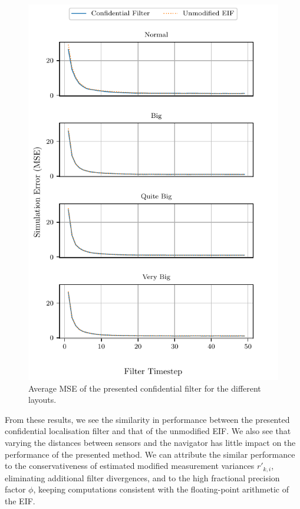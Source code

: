 \begin{figure}[htbp]
    \centering
    \includegraphics{figures/nonlin_fusion_simulation_layout_errors.pdf}
    \caption{Average MSE of the presented confidential filter for the different layouts.}
    \label{fig:nonlin_fusion:simulation_layout_errors}
\end{figure}
From these results, we see the similarity in performance between the presented confidential localisation filter and that of the unmodified EIF. We also see that varying the distances between sensors and the navigator has little impact on the performance of the presented method. We can attribute the similar performance to the conservativeness of estimated modified measurement variances $r'_{k, i}$, eliminating additional filter divergences, and to the high fractional precision factor $\phi$, keeping computations consistent with the floating-point arithmetic of the EIF.


